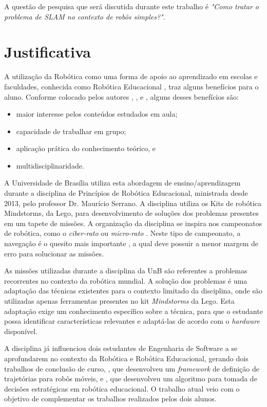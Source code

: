 	A questão de pesquisa que será discutida durante este trabalho é \textit{"Como tratar o problema de SLAM no contexto de robôs simples?"}.

\section{Justificativa}

	A utilização da Robótica como uma forma de apoio ao aprendizado em escolas e faculdades, conhecida como Robótica Educacional \cite{roboticaEducacionalAulasMatematica}, traz alguns benefícios para o aluno. Conforme colocado pelos autores \cite{teachingWithRoboticKit}, \cite{roboticEducationBasedLego}, \cite{roboticaEducacionalAulasMatematica} e \cite{evaluationRoboticEducationScale}, alguns desses benefícios são:
	\begin{itemize}
		\item maior interesse pelos conteúdos estudados em aula;
		\item capacidade de trabalhar em grupo;
		\item aplicação prática do conhecimento teórico, e
		\item multidisciplinaridade.
	\end{itemize}

	 A Universidade de Brasília utiliza esta abordagem de ensino/aprendizagem durante a disciplina de Princípios de Robótica Educacional, ministrada desde 2013, pelo professor Dr. Maurício Serrano. A disciplina utiliza os Kits de robótica Mindstorms, da Lego, para desenvolvimento de soluções dos problemas presentes em um tapete de missões. A organização da disciplina se inspira nos campeonatos de robótica, como o \textit{ciber-rato} \cite{ciber-rato} ou \textit{micro-rato} \cite{roboBulldozerIV}. Neste tipo de campeonato, a navegação é o quesito mais importante \cite{ciber-rato}, a qual deve possuir a menor margem de erro para solucionar as missões.

	As missões utilizadas durante a disciplina da UnB são referentes a problemas recorrentes no contexto da robótica mundial. A solução dos problemas é uma adaptação das técnicas existentes para o contexto limitado da disciplina, onde são utilizadas apenas ferramentas presentes no kit \textit{Mindstorms} da Lego. Esta adaptação exige um conhecimento específico sobre a técnica, para que o estudante possa identificar características relevantes e adaptá-las de acordo com o \textit{hardware} disponível.

	A disciplina já influenciou dois estudantes de Engenharia de Software a se aprofundarem no contexto da Robótica e Robótica Educacional, gerando dois trabalhos de conclusão de curso, \cite{tccRodrigo}, que desenvolveu um \textit{framework} de definição de trajetórias para robôs móveis, e \cite{tccCarol}, que desenvolveu um algoritmo para tomada de decisões estratégicas em robótica educacional. O trabalho atual veio com o objetivo de complementar os trabalhos realizados pelos dois alunos.


